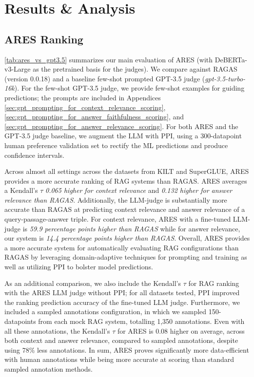 
\section{Results \& Analysis}
\label{sec:results_and_analysis}

\subsection{ARES Ranking}



\autoref{tab:ares_vs_gpt3.5} summarizes our main evaluation of ARES (with DeBERTa-v3-Large as the pretrained basis for the judges). We compare against RAGAS (version 0.0.18) and a baseline few-shot prompted GPT-3.5 judge (\textit{gpt-3.5-turbo-16k}).
For the few-shot GPT-3.5 judge, we provide few-shot examples for guiding predictions; the prompts are included in Appendices \ref{sec:gpt_prompting_for_context_relevance_scoring}, \ref{sec:gpt_prompting_for_answer_faithfulness_scoring}, and \ref{sec:gpt_prompting_for_answer_relevance_scoring}.
For both ARES and the GPT-3.5 judge baseline, we augment the LLM with PPI, using a 300-datapoint human preference validation set to rectify the ML predictions and produce confidence intervals.

Across almost all settings across the datasets from KILT and SuperGLUE,
ARES provides a more accurate ranking of RAG systems than RAGAS. ARES averages a Kendall's $\tau$ \textit{0.065 higher for context relevance} and \textit{0.132 higher for answer relevance than RAGAS}.
Additionally, the LLM-judge is substantially more accurate than RAGAS at predicting context relevance and answer relevance of a query-passage-answer triple.
For context relevance, ARES with a fine-tuned LLM-judge is \textit{59.9 percentage points higher than RAGAS} while for answer relevance, our system is \textit{14.4 percentage points higher than RAGAS}. 
Overall, ARES provides a more accurate system for automatically evaluating RAG configurations than RAGAS by leveraging domain-adaptive techniques for prompting and training as well as utilizing PPI to bolster model predictions.

As an additional comparison, we also include the Kendall's $\tau$ for RAG ranking with the ARES LLM judge without PPI; for all datasets tested, PPI improved the ranking prediction accuracy of the fine-tuned LLM judge.
Furthermore, we included a sampled annotations configuration, in which we sampled 150-datapoints from each mock RAG system, totalling 1,350 annotations.
Even with all these annotations, the Kendall's $\tau$ for ARES is 0.08 higher on average, across both context and answer relevance, compared to sampled annotations, despite using 78\% less annotations.
In sum, ARES proves significantly more data-efficient with human annotations while being more accurate at scoring than standard sampled annotation methods.

